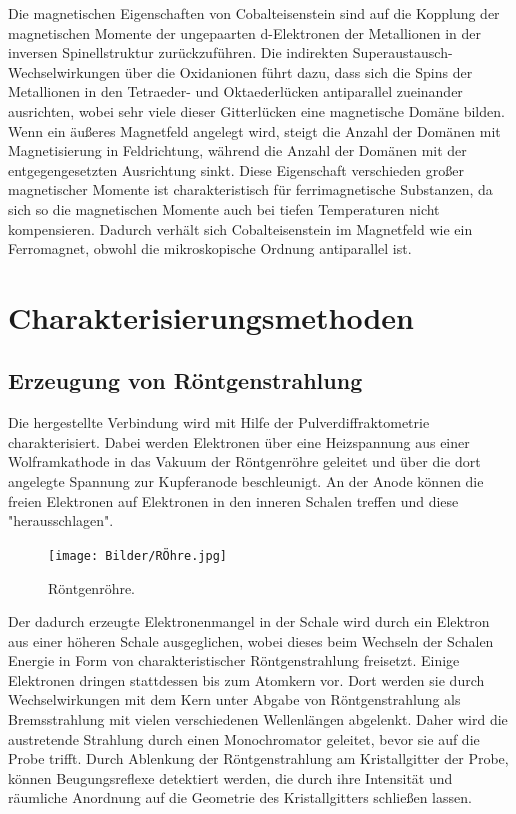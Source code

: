 \documentclass[a4paper,12pt,bibliography=totocnumbered]{scrartcl}
\begin{document}
Die magnetischen Eigenschaften von Cobalteisenstein sind auf die Kopplung der magnetischen Momente der ungepaarten d-Elektronen der Metallionen in  der inversen Spinellstruktur zurückzuführen.
Die indirekten Superaustausch-Wechselwirkungen über die Oxidanionen führt dazu, dass sich die Spins der Metallionen in den Tetraeder- und Oktaederlücken antiparallel zueinander ausrichten, wobei sehr viele dieser Gitterlücken eine magnetische Domäne bilden. 
Wenn ein äußeres Magnetfeld angelegt wird, steigt die Anzahl der Domänen mit Magnetisierung in Feldrichtung, während die Anzahl der Domänen mit der entgegengesetzten Ausrichtung sinkt. 
Diese Eigenschaft verschieden großer magnetischer Momente ist charakteristisch für ferrimagnetische Substanzen, da sich so die magnetischen Momente auch bei tiefen Temperaturen nicht kompensieren. 
Dadurch verhält sich Cobalteisenstein im Magnetfeld wie ein Ferromagnet, obwohl die mikroskopische Ordnung antiparallel ist. \cite{Müller}

\section{Charakterisierungsmethoden}

\subsection{Erzeugung von Röntgenstrahlung}
Die hergestellte Verbindung wird mit Hilfe der Pulverdiffraktometrie charakterisiert.
Dabei werden Elektronen über eine Heizspannung aus einer Wolframkathode in das Vakuum der Röntgenröhre geleitet und über die dort angelegte Spannung zur Kupferanode beschleunigt. 
An der Anode können die freien Elektronen auf Elektronen in den inneren Schalen treffen und diese "herausschlagen".
\begin{figure}[H]
    \centering
    \texttt{[image: Bilder/RÖhre.jpg]}
    \caption{Röntgenröhre. \cite{Kristallgitter}}
    \label{fig: Röhre}
\end{figure}
Der dadurch erzeugte Elektronenmangel in der Schale wird durch ein Elektron aus einer höheren Schale ausgeglichen, wobei dieses beim Wechseln der Schalen Energie in Form von charakteristischer Röntgenstrahlung freisetzt. 
Einige Elektronen dringen stattdessen bis zum Atomkern vor. 
Dort werden sie durch Wechselwirkungen mit dem Kern unter Abgabe von Röntgenstrahlung als Bremsstrahlung mit vielen verschiedenen Wellenlängen abgelenkt.
Daher wird die austretende Strahlung durch einen Monochromator geleitet, bevor sie auf die Probe trifft. 
Durch Ablenkung der Röntgenstrahlung am Kristallgitter der Probe, können Beugungsreflexe detektiert werden, die durch ihre Intensität und räumliche Anordnung auf die Geometrie des Kristallgitters schließen lassen.
\end{document}
